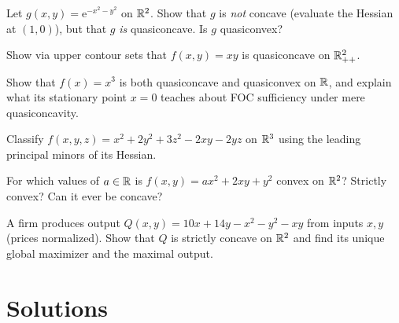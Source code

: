 \begin{problems}
  \item Let $g(x,y)=\mathrm{e}^{-x^{2}-y^{2}}$ on $\mathbb{R}^{2}$. Show that $g$
        is \emph{not} concave (evaluate the Hessian at $(1,0)$), but that
        $g$ \emph{is} quasiconcave. Is $g$ quasiconvex?
  \item Show via upper contour sets that $f(x,y)=xy$ is quasiconcave on
        $\mathbb{R}^{2}_{++}$.
  \item Show that $f(x)=x^{3}$ is both quasiconcave and quasiconvex on
        $\mathbb{R}$, and explain what its stationary point $x=0$ teaches about
        FOC sufficiency under mere quasiconcavity.
  \item Classify $f(x,y,z)=x^{2}+2y^{2}+3z^{2}-2xy-2yz$ on $\mathbb{R}^{3}$ using
        the leading principal minors of its Hessian.
  \item For which values of $a\in\mathbb{R}$ is $f(x,y)=ax^{2}+2xy+y^{2}$ convex
        on $\mathbb{R}^{2}$? Strictly convex? Can it ever be concave?
  \item A firm produces output $Q(x,y)=10x+14y-x^{2}-y^{2}-xy$ from inputs
        $x,y$ (prices normalized). Show that $Q$ is strictly concave on
        $\mathbb{R}^{2}$ and find its unique global maximizer and the maximal
        output.
\end{problems}

\section{Solutions}

